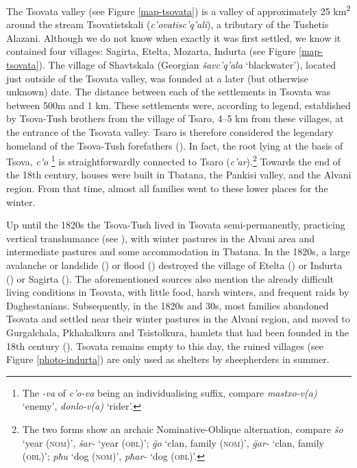The Tsovata valley (see Figure \ref{map-tsovata}) is a valley of approximately 25 km\textsuperscript{2} around the stream Tsovatistskali (\textit{c'ovatisc'q'ali}), a tributary of the Tushetis Alazani. Although we do not know when exactly it was first settled, we know it contained four villages: Sagirta, Etelta, Mozarta, Indurta (see Figure \ref{map-tsovata}). The village of Shavtskala (Georgian \textit{šavc'q'ala} `blackwater'), located just outside of the Tsovata valley, was founded at a later (but otherwise unknown) date. The distance between each of the settlements in Tsovata was between 500m and 1 km. These settlements were, according to legend, established by Tsova-Tush brothers from the village of Tsaro, 4--5 km from these villages, at the entrance of the Tsovata valley. Tsaro is therefore considered the legendary homeland of the Tsova-Tush forefathers (\cite{desheriev53}). In fact, the root lying at the basis of Tsova, \textit{c'o} \footnote{The \textit{-va} of \textit{c'o-va} being an individualising suffix, compare \textit{mastxo-v(a)} `enemy', \textit{donlo-v(a)} `rider'.} is straightforwardly connected to Tsaro (\textit{c'ar}).\footnote{The two forms show an archaic Nominative-Oblique alternation, compare \textit{šo} `year (\textsc{nom})', \textit{šar-} `year (\textsc{obl})'; \textit{\u{g}o} `clan, family (\textsc{nom})', \textit{\u{g}ar-} `clan, family (\textsc{obl})'; \textit{pħu} `dog (\textsc{nom})', \textit{pħar-} `dog (\textsc{obl})'.} Towards the end of the 18th century, houses were built in Tbatana, the Pankisi valley, and the Alvani region. From that time, almost all families went to these lower places for the winter.


Up until the 1820s the Tsova-Tush lived in Tsovata semi-permanently, practicing vertical transhumance (see ), with winter pastures in the Alvani area and intermediate pastures and some accommodation in Tbatana. In the 1820s, a large avalanche or landslide (\cite{makalatia1933tusheti}) or flood (\cite{itonishvili2012tush}) destroyed the village of Etelta (\cite{makalatia1933tusheti}) or Indurta (\cite{itonishvili2012tush}) or Sagirta (\cite{desheriev53}). The aforementioned sources also mention the already difficult living conditions in Tsovata, with little food, harsh winters, and frequent raids by Daghestanians. Subsequently, in the 1820s and 30s, most families abandoned Tsovata and settled near their winter pastures in the Alvani region, and moved to Gurgalchala, Pkhakalkura and Tsistolkura, hamlets that had been founded in the 18th century (\cites[]{faehnrich01dict}). Tsovata remains empty to this day, the ruined villages (see Figure \ref{photo-indurta}) are only used as shelters by sheepherders in summer.


